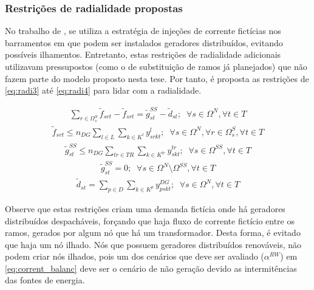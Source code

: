 \subsubsection*{Restrições de radialidade propostas}

No trabalho de , se utiliza a estratégia de injeções de corrente fictícias nos barramentos em que podem ser instalados geradores distribuídos, evitando possíveis ilhamentos. Entretanto, estas restrições de radialidade adicionais utilizavam pressupostos (como o de substituição de ramos já planejados) que não fazem parte do modelo proposto nesta tese.  Por tanto, é proposta as restrições de \eqref{eq:radi3} até \eqref{eq:radi4} para lidar com a radialidade.

\begin{align}
    \sum_{r \in \Omega^S_s} \widetilde{f}_{srt} - \widetilde{f}_{srt} = \widetilde{g}_{st}^{SS} - \widetilde{d}_{st};\;\; \forall s \in \Omega^N, \forall t \in T
    \label{eq:radi3}
\end{align}
\begin{align}
     \widetilde{f}_{srt} \leq n_{DG} \sum_{l\in L} \sum_{k \in K^l} y^l_{srkt};\;\; \forall s \in \Omega^N, \forall r \in \Omega^S_s, \forall t \in T
\end{align}
\begin{align}
     \widetilde{g}_{st}^{SS} \leq n_{DG}\sum_{tr\in TR} \sum_{k \in K^{tr}} y^{tr}_{skt};\;\; \forall s \in \Omega^{SS}, \forall t \in T
\end{align}
\begin{align}
     \widetilde{g}_{st}^{SS} = 0;\;\; \forall s \in \Omega^{N} \setminus \Omega^{SS}, \forall t \in T
\end{align}
\begin{align}
     \widetilde{d}_{st} = \sum_{p \in D} \sum_{k \in K^p} y^{DG}_{pskt};\;\; \forall s \in \Omega^N, \forall t \in T
     \label{eq:radi4}
\end{align}

Observe que estas restrições criam uma demanda fictícia onde há geradores distribuídos despacháveis, forçando que haja fluxo de corrente fictício entre os ramos, gerados por algum nó que há um transformador. Desta forma, é evitado que haja um nó ilhado. Nós que possuem geradores distribuídos renováveis, não podem criar nós ilhados, pois um dos cenários que deve ser avaliado ($\alpha^{RW}$) em \eqref{eq:corrent_balanc} deve ser o cenário de não geração devido as intermitências das fontes de energia.

